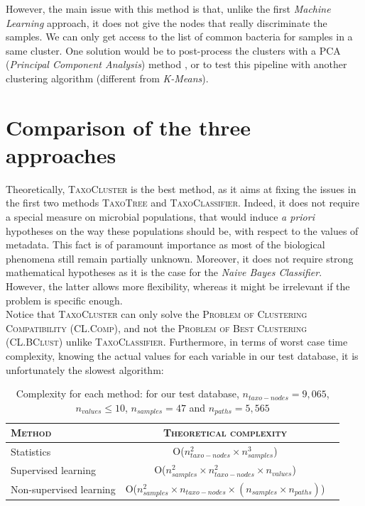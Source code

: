\documentclass{report}
\begin{document}
However, the main issue with this method is that, unlike the first \emph{Machine Learning} approach, it does not give the nodes that really discriminate the samples. We can only get access to the list of common bacteria for samples in a same cluster. One solution would be to post-process the clusters with a PCA (\emph{Principal Component Analysis}) method \cite{PCA}, or to test this pipeline with another clustering algorithm (different from \emph{K-Means}).


\newpage

\chapter{Comparison of the three approaches}

Theoretically, \textsc{TaxoCluster} is the best method, as it aims at fixing the issues in the first two methods \textsc{TaxoTree} and \textsc{TaxoClassifier}. Indeed, it does not require a special measure on microbial populations, that would induce \emph{a priori} hypotheses on the way these populations should be, with respect to the values of metadata. This fact is of paramount importance as most of the biological phenomena still remain partially unknown. Moreover, it does not require strong mathematical hypotheses as it is the case for the \emph{Naive Bayes Classifier}. However, the latter allows more flexibility, whereas it might be irrelevant if the problem is specific enough.\\

Notice that \textsc{TaxoCluster} can only solve the \textsc{Problem of Clustering Compatibility (CL.Comp)}, and not the \textsc{Problem of Best Clustering (CL.BClust)} unlike \textsc{TaxoClassifier}. Furthermore, in terms of worst case time complexity, knowing the actual values for each variable in our test database, it is unfortunately the slowest algorithm:\\

    \begin{table}
      \caption{Complexity for each method: for our test database, $n_{taxo-nodes} = 9,065$, $n_{values} \le 10$, $n_{samples} = 47$ and $n_{paths} = 5,565$}
      \begin{tabular}{|l|c|r|}
        \hline
        \textsc{Method} & \textsc{Theoretical complexity} \\
        \hline
        Statistics & O($n_{taxo-nodes}^{2} \times n_{samples}^{3}$)\\
        \hline
        Supervised learning & O($n_{samples}^{2} \times n_{taxo-nodes}^{2} \times n_{values}$)\\
        \hline
        Non-supervised learning & O($n_{samples}^{2} \times n_{taxo-nodes}\times (n_{samples} \times n_{paths})$)\\
        \hline
      \end{tabular}
    \end{table}
\end{document}
